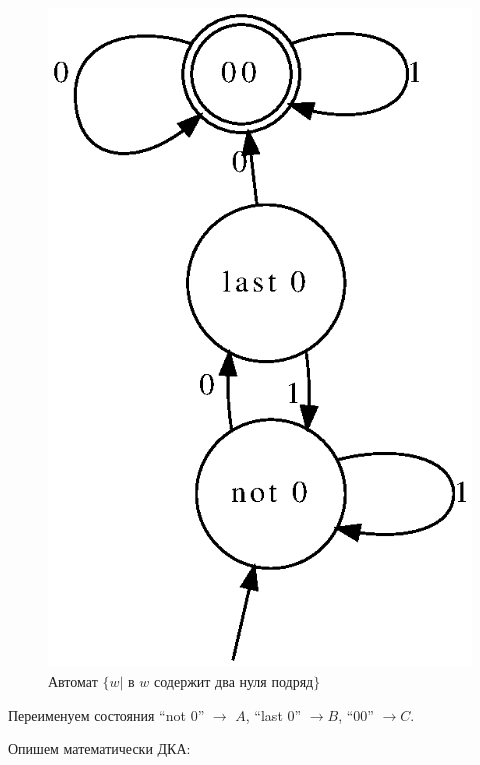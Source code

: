 \begin{figure}
\begin{minipage}{.5\textwidth}
      \includegraphics[scale=0.7]{graphs/ZZ.eps}
      \caption{Автомат $\{w | \text{ в } w \text{ содержит два нуля подряд}\}$}
    \end{minipage}
\end{figure}

Переименуем состояния ``not $0$'' $\to$ $A$, ``last $0$'' $\to B$, ``$00$'' $\to C$.

Опишем математически ДКА:

